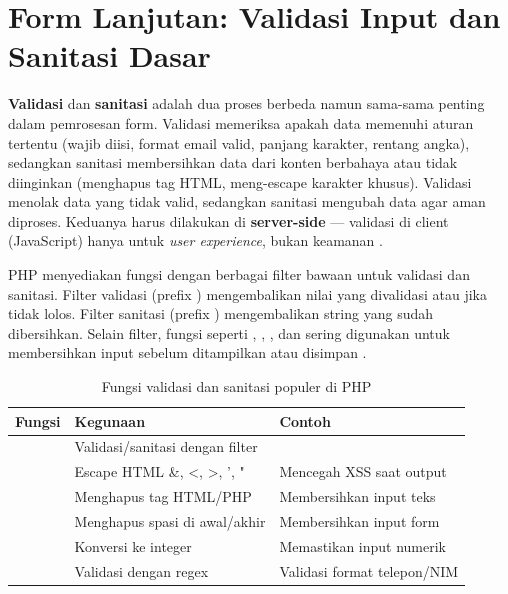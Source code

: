 ﻿\section{Form Lanjutan: Validasi Input dan Sanitasi Dasar}

\textbf{Validasi} dan \textbf{sanitasi} adalah dua proses berbeda namun sama-sama penting dalam pemrosesan form. Validasi memeriksa apakah data memenuhi aturan tertentu (wajib diisi, format email valid, panjang karakter, rentang angka), sedangkan sanitasi membersihkan data dari konten berbahaya atau tidak diinginkan (menghapus tag HTML, meng-escape karakter khusus). Validasi menolak data yang tidak valid, sedangkan sanitasi mengubah data agar aman diproses. Keduanya harus dilakukan di \textbf{server-side} --- validasi di client (JavaScript) hanya untuk \textit{user experience}, bukan keamanan \cite{phpManual}.

PHP menyediakan fungsi  dengan berbagai filter bawaan untuk validasi dan sanitasi. Filter validasi (prefix ) mengembalikan nilai yang divalidasi atau  jika tidak lolos. Filter sanitasi (prefix ) mengembalikan string yang sudah dibersihkan. Selain filter, fungsi seperti , , , dan  sering digunakan untuk membersihkan input sebelum ditampilkan atau disimpan \cite{phpRightWay}.

\begin{table}[H]
\centering
\small
\begin{tabular}{|P{2.15cm}|P{3.65cm}|P{3.65cm}|}
\hline
\textbf{Fungsi} & \textbf{Kegunaan} & \textbf{Contoh} \\
\hline
{} & Validasi/sanitasi dengan filter & \linebreak[0] \\
\hline
{} & Escape HTML \&, <, >, ', " & Mencegah XSS saat output \\
\hline
{} & Menghapus tag HTML/PHP & Membersihkan input teks \\
\hline
{} & Menghapus spasi di awal/akhir & Membersihkan input form \\
\hline
{} & Konversi ke integer & Memastikan input numerik \\
\hline
{} & Validasi dengan regex & Validasi format telepon/NIM \\
\hline
\end{tabular}
\caption{Fungsi validasi dan sanitasi populer di PHP}
\end{table}

